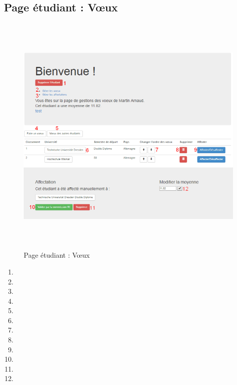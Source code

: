          \subsection{Page étudiant : Vœux}
         \label{ev}
         \begin{figure}[H]
         	\centering
         	\includegraphics[width=16cm,height=12cm]{Images/Admin/page_etud_admin.png}
         	\caption{Page étudiant : Vœux}
         	
         \end{figure}
                      \begin{enumerate}
                      	\item
                      	\item
                      	\item
                      	\item
                      	\item
                      	\item
                      	\item
                      	\item
                      	\item
                      	\item
                      	\item
                      	\item
                      \end{enumerate}

